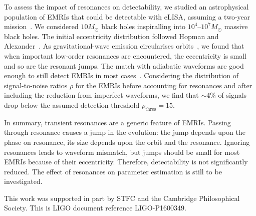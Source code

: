 \documentclass[a4paper]{jpconf}
\begin{document}
To assess the impact of resonances on detectability, we studied an astrophysical population of EMRIs that could be detectable with eLISA, assuming a two-year mission~\cite{Amaro-Seoane2012a}. We considered $10 M_\odot$ black holes inspiralling into $10^4$--$10^7 M_\odot$ massive black holes. The initial eccentricity distribution followed Hopman and Alexander~\cite{Hopman2005}. As gravitational-wave emission circularises orbits~\cite{Peters1964}, we found that when important low-order resonances are encountered, the eccentricity is small and so are the resonant jumps. The match with adiabatic waveforms are good enough to still detect EMRIs in most cases~\cite{Berry2016a}. Considering the distribution of signal-to-noise ratios $\rho$ for the EMRIs before accounting for resonances and after including the reduction from imperfect waveforms, we find that $\sim4\%$ of signals drop below the assumed detection threshold $\rho_\mathrm{thres} = 15$.



In summary, transient resonances are a generic feature of EMRIs. Passing through resonance causes a jump in the evolution: the jump depends upon the phase on resonance, its size depends upon the orbit and the resonance. Ignoring resonances leads to waveform mismatch, but jumps should be small for most EMRIs because of their eccentricity. Therefore, detectability is not significantly reduced. The effect of resonances on parameter estimation is still to be investigated.

\ack
This work was supported in part by STFC and the Cambridge Philosophical Society. This is LIGO document reference LIGO-P1600349.



\end{document}
